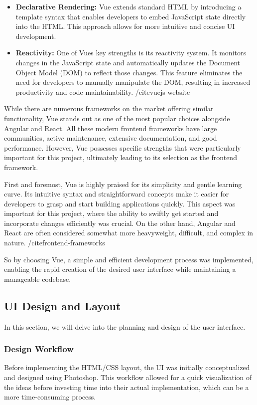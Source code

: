 \documentclass[a4paper,10pt]{report} %
\begin{document}
\begin{itemize}
  \item \textbf{Declarative Rendering:} Vue extends standard HTML by introducing a template syntax that enables developers to embed JavaScript state directly into the HTML. This approach allows for more intuitive and concise UI development.

  \item \textbf{Reactivity:} One of Vues key strengths is its reactivity system. It monitors changes in the JavaScript state and automatically updates the Document Object Model (DOM) to reflect those changes. This feature eliminates the need for developers to manually manipulate the DOM, resulting in increased productivity and code maintainability. /cite{vuejs website}
\end{itemize}

While there are numerous frameworks on the market offering similar functionality, Vue stands out as one of the most popular choices alongside Angular and React. All these modern frontend frameworks have large communities, active maintenance, extensive documentation, and good performance. However, Vue possesses specific strengths that were particularly important for this project, ultimately leading to its selection as the frontend framework.

First and foremost, Vue is highly praised for its simplicity and gentle learning curve. Its intuitive syntax and straightforward concepts make it easier for developers to grasp and start building applications quickly. This aspect was important for this project, where the ability to swiftly get started and incorporate changes efficiently was crucial. On the other hand, Angular and React are often considered somewhat more heavyweight, difficult, and complex in nature. /cite{frontend-frameworks}

So by choosing Vue, a simple and efficient development process was implemented, enabling the rapid creation of the desired user interface while maintaining a manageable codebase.

\subsection{UI Design and Layout}
In this section, we will delve into the planning and design of the user interface.

\subsubsection{Design Workflow}
Before implementing the HTML/CSS layout, the UI was initially conceptualized and designed using Photoshop. This workflow allowed for a quick visualization of the ideas before investing time into their actual implementation, which can be a more time-consuming process. %
\end{document}
